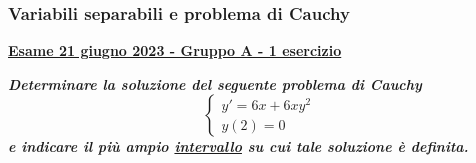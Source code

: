 \documentclass[a4paper]{article}
\newcommand{\definition}[1]{\textcolor{Red3}{\textbf{#1}}}
\newcommand{\example}[1]{\textcolor{Green4}{\textbf{#1}}}
\begin{document}
	\subsubsection{Variabili separabili e problema di Cauchy}\label{subsubsection: variabili separabili e problema di Cauchy}

	\begin{flushleft}
		\label{exam: esame 21 giugno 2023 - Gruppo A - 1 esercizio}
		\hypertarget{
			exam: esame 21 giugno 2023 - Gruppo A - 1 esercizio
		}{
			\definition{\underline{Esame 21 giugno 2023 - Gruppo A - 1 esercizio}}
		}
	\end{flushleft}
	\example{\emph{Determinare la soluzione del seguente problema di Cauchy}
	\begin{equation*}
		\begin{cases}
			y'=6x+6xy^{2} \\
			y\left(2\right) = 0
		\end{cases}
	\end{equation*}
	\emph{e indicare il più ampio \underline{intervallo} su cui tale soluzione è definita.}}\newline
\end{document}
